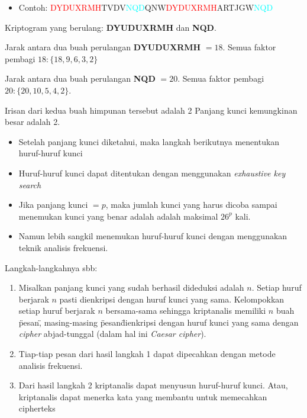 \documentclass{article}
\begin{document}
\newpage


\begin{itemize}
  \item Contoh:
  \vspace{5mm}
  \textcolor{red}{DYDUXRMH}TVDV\textcolor{cyan}{NQD}QNW\textcolor{red}{DYDUXRMH}ARTJGW\textcolor{cyan}{NQD}
\end{itemize}

Kriptogram yang berulang: \textbf{DYUDUXRMH} dan \textbf{NQD}.

Jarak antara dua buah perulangan \textbf{DYUDUXRMH} $= 18$.
Semua faktor pembagi $18 : \{18, 9, 6, 3, 2\}$

Jarak antara dua buah perulangan \textbf{NQD} $= 20$.
Semua faktor pembagi $20 : \{20, 10, 5, 4, 2\}$.

Irisan dari kedua buah himpunan tersebut adalah 2
Panjang kunci kemungkinan besar adalah 2.

\newpage


\begin{itemize}
    \item Setelah panjang kunci diketahui, maka langkah berikutnya menentukan huruf-huruf kunci
    \item Huruf-huruf kunci dapat ditentukan dengan menggunakan \textit{exhaustive key search}
    \item Jika panjang kunci $= p$, maka jumlah kunci yang harus dicoba sampai menemukan kunci yang benar adalah adalah maksimal $26^p$ kali.
    \item Namun lebih sangkil menemukan huruf-huruf kunci dengan menggunakan teknik analisis frekuensi.
\end{itemize}

\newpage


Langkah-langkahnya sbb:

\begin{enumerate}
  \item Misalkan panjang kunci yang sudah berhasil dideduksi adalah $n$. Setiap huruf berjarak $n$ pasti dienkripsi dengan huruf kunci yang sama. Kelompokkan setiap huruf berjarak $n$ bersama-sama sehingga kriptanalis memiliki $n$ buah \"pesan\", masing-masing \"pesan\" dienkripsi dengan huruf kunci yang sama dengan \textit{cipher} abjad-tunggal (dalam hal ini \textit{Caesar cipher}).
  \item Tiap-tiap pesan dari hasil langkah 1 dapat dipecahkan dengan metode analisis frekuensi.
  \item Dari hasil langkah 2 kriptanalis dapat menyusun huruf-huruf kunci. Atau, kriptanalis dapat menerka kata yang membantu untuk memecahkan cipherteks
\end{enumerate}
\end{document}
